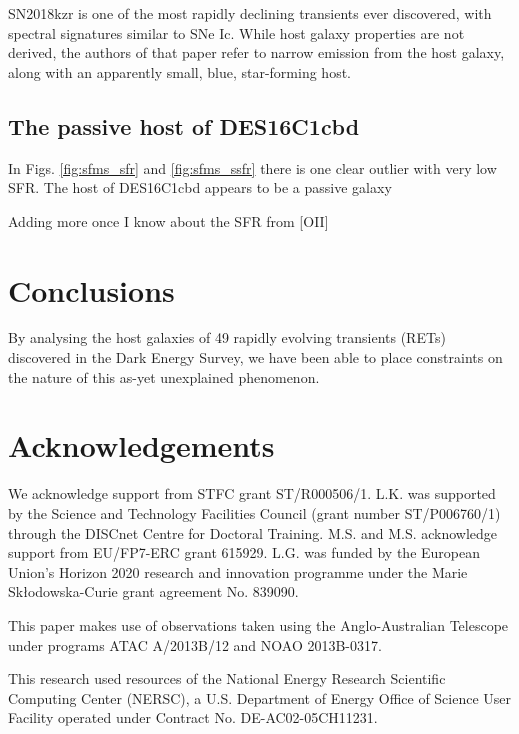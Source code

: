 \documentclass[fleqn,usenatbib,]{mnras}
\newcommand{\phil}[1]{\color{red}#1 \color{black}}
\begin{document}
SN2018kzr \citep{McBrien2019} is one of the most rapidly declining transients ever discovered, with spectral signatures similar to SNe Ic. While host galaxy properties are not derived, the authors of that paper refer to narrow emission from the host galaxy, along with an apparently small, blue, star-forming host. 

\subsection{The passive host of DES16C1cbd \label{subsec:disc_cbd}}
In Figs. \ref{fig:sfms_sfr} and \ref{fig:sfms_ssfr} there is one clear outlier with very low SFR. The host of DES16C1cbd appears to be a passive galaxy 

\phil{Adding more once I know about the SFR from [OII]}
\section{Conclusions}

By analysing the host galaxies of 49 rapidly evolving transients (RETs) discovered in the Dark Energy Survey, we have been able to place constraints on the nature of this as-yet unexplained phenomenon. 

\section*{Acknowledgements}

We acknowledge support from STFC grant ST/R000506/1. L.K. was supported by the Science and Technology Facilities Council (grant number ST/P006760/1) through the DISCnet Centre for Doctoral Training. M.S. and M.S. acknowledge support from EU/FP7-ERC grant 615929. L.G. was funded by the European Union's Horizon 2020 research and innovation programme under the Marie Sk\l{}odowska-Curie grant agreement No. 839090.

This paper makes use of observations taken using the Anglo-Australian Telescope under programs ATAC A/2013B/12 and NOAO 2013B-0317.

This research used resources of the National Energy Research Scientific Computing Center (NERSC), a U.S. Department of Energy Office of Science User Facility operated under Contract No. DE-AC02-05CH11231.
\end{document}
